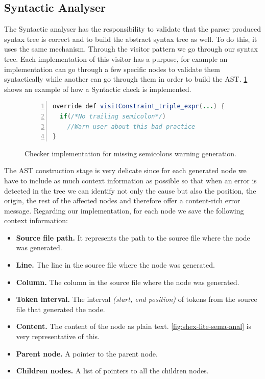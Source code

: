 \subsection{Syntactic Analyser}
The Syntactic analyser has the responsibility to validate that the parser produced syntax tree is correct and to build the abstract syntax
tree as well. To do this, it uses the same mechanism. Through the visitor pattern we go through our syntax tree. Each implementation
of this visitor has a purpose, for example an implementation can go through a few specific nodes to validate them syntactically
while another can go through them in order to build the AST. \cref{fig:checker-example} shows an example of how a Syntactic check is
implemented.

\begin{figure}
    \begin{lstlisting}[language=Java,numbers=left,basicstyle=\ttfamily\scriptsize]
override def visitConstraint_triple_expr(...) {
  if(/*No trailing semicolon*/)
    //Warn user about this bad practice
}
    \end{lstlisting}
    \caption[Checker implementation for missing semicolons warning generation]{Checker implementation for missing semicolons warning generation.}
    \label{fig:checker-example}
\end{figure}

The AST construction stage is very delicate since for each generated node we have to include as much context information as possible
so that when an error is detected in the tree we can identify not only the cause but also the position, the origin, the rest of the
affected nodes and therefore offer a content-rich error message. Regarding our implementation, for each node we save the following
context information:
\begin{itemize}
    \item \textbf{Source file path.} It represents the path to the source file where the node was generated.
    \item \textbf{Line.} The line in the source file where the node was generated.
    \item \textbf{Column.} The column in the source file where the node was generated.
    \item \textbf{Token interval.} The interval \textit{(start, end position)} of tokens from the source file that generated the node.
    \item \textbf{Content.} The content of the node as plain text. \cref{fig:shex-lite-sema-anal} is very representative of this. 
    \item \textbf{Parent node.} A pointer to the parent node.
    \item \textbf{Children nodes.} A list of pointers to all the children nodes.
\end{itemize}

